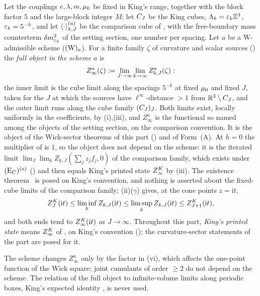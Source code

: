 \begin{definition}\label{rot:def:full}
Let the couplings $e,\lambda,m,\mu_0$ be fixed in King's range, together with the block factor $5$ and the large-block integer $M$; let $C_J$ be the King cubes, $\Lambda_k=\varepsilon_k\mathbb Z^3$, $\varepsilon_k=5^{-k}$, and let $\langle \cdot\rangle^{(a)}_{k,J}$ be the comparison cube of , with the free-boundary mass counterterm $\delta m^2_{\varepsilon_k}$ of the setting section, one number per spacing. Let $a$ be a $\mathrm W$-admissible scheme ($(\mathrm W)_{a}$). For a finite family $\zeta$ of curvature and scalar sources () the \emph{full object in the scheme $a$} is
\[
Z^a_\infty(\zeta):=\lim_{J\to\infty}\lim_{k\to\infty}Z^a_{k,J}(\zeta):
\]
the inner limit is the cube limit along the spacings $5^{-k}$ at fixed $\mu_0$ and fixed $J$, taken for the $J$ at which the sources have $\ell^\infty$-distance $>1$ from $\mathbb R^3\setminus C_J$, and the outer limit runs along the cube family $(C_J)_J$. Both limits exist, locally uniformly in the coefficients, by (i),(iii), and $Z^a_\infty$ is the functional so named among the objects of the setting section, on the comparison convention. It is the object of the Wick-sector theorems of this part () and of Form~(A). At $h=0$ the multiplier of  is $1$, so the object does not depend on the scheme: it is the iterated limit $\lim_J\lim_kZ_{k,J}(\sum_jz_jf_j,0)$ of the comparison family, which exists under $(\mathrm{E}_{C})^{(a)}$ () and then equals King's printed state $Z^{K}_{\infty}$ by (iii). The existence theorem \EC\ is posed on King's convention, and nothing is asserted about the fixed-cube limits of the comparison family; (ii)($\gamma$) gives, at the cone points $z=\mathrm it$,
\[
Z^{K}_{J}(\mathrm it)\le\liminf_kZ_{k,J}(\mathrm it)\le\limsup_kZ_{k,J}(\mathrm it)\le Z^K_{J+1}(\mathrm it),
\]
and both ends tend to $Z^{K}_{\infty}(\mathrm it)$ as $J\to\infty$. Throughout this part, \emph{King's printed state} means $Z^{K}_{\infty}$ of , on King's convention (\EC); the curvature-sector statements of the part are posed for it.
\end{definition}

\begin{remark}[scope]\label{rot:rem:scope}
The scheme changes $Z^a_\infty$ only by the factor in (vi), which affects the one-point function of the Wick square; joint cumulants of order $\ge2$ do not depend on the scheme. The relation of the full object to infinite-volume limits along periodic boxes, King's expected identity \cite[(2.24)]{K2}, is never used.
\end{remark}

